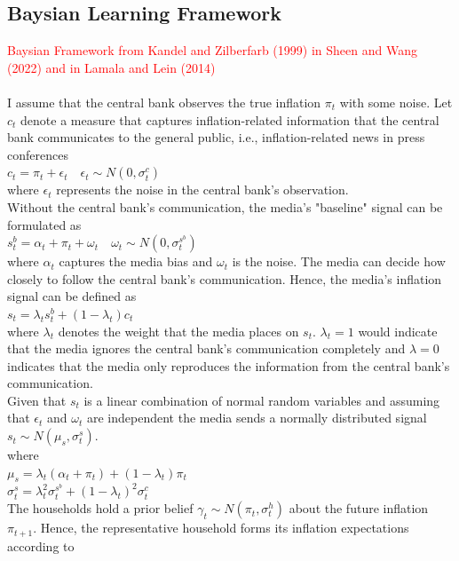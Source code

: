 \documentclass[review]{elsarticle}
\begin{document}
\subsection{Baysian Learning Framework}
\textcolor{red}{Baysian Framework from Kandel and Zilberfarb (1999) in Sheen and Wang (2022) and in Lamala and Lein (2014)}\\
\\
I assume that the central bank observes the true inflation $\pi_t$ with some noise. Let $c_t$ denote a measure that captures inflation-related information that the central bank communicates to the general public, i.e., inflation-related news in press conferences
\\
$ c_t = \pi_t + \epsilon_t \quad \epsilon_t \sim N(0, \sigma^c_t)$
\\ 
where $\epsilon_t$ represents the noise in the central bank's observation. 
\\
Without the central bank's communication, the media's "baseline" signal can be formulated as
\\
$ s^b_t = \alpha_t + \pi_t + \omega_t  \quad \omega_t \sim N(0, \sigma_t^{s^b}) $
\\
where $\alpha_t$ captures the media bias and $\omega_t$ is the noise. The media can decide how closely to follow the central bank's communication. Hence, the media's inflation signal can be defined as 
\\
$ s_t = \lambda_t s^b_t + (1-\lambda_t)c_t $
\\ 
where $\lambda_t$ denotes the weight that the media places on $s_t$. $\lambda_t = 1$ would indicate that the media ignores the central bank's communication completely and $\lambda = 0$ indicates that the media only reproduces the information from the central bank's communication. 
\\
Given that $s_t$ is a linear combination of normal random variables and assuming that $\epsilon_t $ and $\omega_t$ are independent the media sends a normally distributed signal $s_t \sim N(\mu_s, \sigma^s_t).$ 
\\
where 
\\$\mu_s = \lambda_t (\alpha_t + \pi_t) + (1-\lambda_t) \pi_t$ 
\\
$\sigma_t^s = \lambda_t^2 \sigma_t^{s^b} + (1- \lambda_t)^2 \sigma^c_t$
\\
The households hold a prior belief $\gamma_t \sim N(\pi_t, \sigma^h_t)$ about the future inflation $\pi_{t+1}$. Hence, the representative household forms its inflation expectations according to
\end{document}
